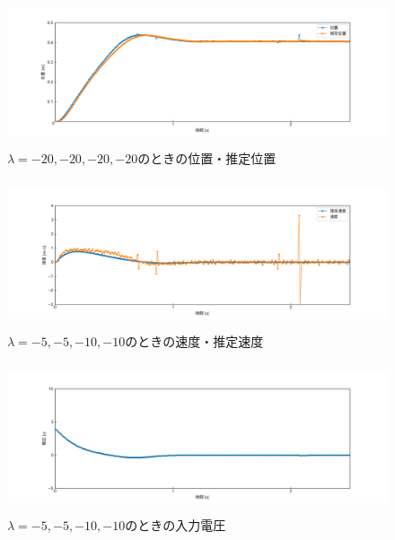 \documentclass[12pt]{jsarticle}
\begin{document}
\begin{figure}[H]
  \begin{center}
    \includegraphics[clip,width=13.0cm, height=4.4cm]{../img/Exp11-1.png}
    \caption{$\lambda=-20, -20, -20, -20$のときの位置・推定位置}
    \label{Exp11-1}
  \end{center}
\end{figure}
\begin{figure}[H]
  \begin{center}
    \includegraphics[clip,width=13.0cm, height=4.4cm]{../img/Exp11-2.png}
    \caption{$\lambda=-5, -5, -10, -10$のときの速度・推定速度}
    \label{Exp11-2}
  \end{center}
\end{figure}
\begin{figure}[H]
  \begin{center}
    \includegraphics[clip,width=13.0cm, height=4.4cm]{../img/Exp11-3.png}
    \caption{$\lambda=-5, -5, -10, -10$のときの入力電圧}
    \label{Exp11-3}
  \end{center}
\end{figure}
\end{document}
